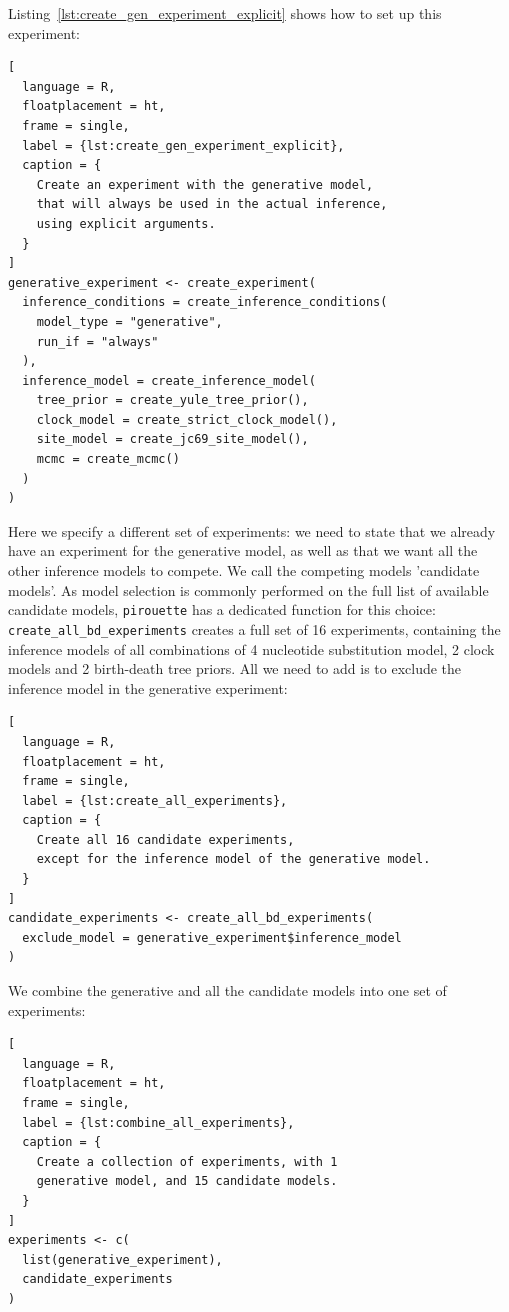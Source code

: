 Listing~\ref{lst:create_gen_experiment_explicit} shows how to
set up this experiment:

\begin{lstlisting}[
  language = R,
  floatplacement = ht,
  frame = single,
  label = {lst:create_gen_experiment_explicit},
  caption = {
    Create an experiment with the generative model,
    that will always be used in the actual inference, 
    using explicit arguments.
  }
]
generative_experiment <- create_experiment(
  inference_conditions = create_inference_conditions(
    model_type = "generative", 
    run_if = "always"
  ), 
  inference_model = create_inference_model(
    tree_prior = create_yule_tree_prior(),
    clock_model = create_strict_clock_model(), 
    site_model = create_jc69_site_model(),
    mcmc = create_mcmc()
  )
)
\end{lstlisting}

Here we specify a different set of experiments: we
need to state that we already have an experiment for
the generative model, as well as that we want all the other inference models 
to compete. We call the competing models 'candidate models'.
As model selection is commonly performed on the full list of available 
candidate models, \verb;pirouette; has a dedicated function 
for this choice: \verb;create_all_bd_experiments; creates a full set 
of 16 experiments, 
containing the inference models of all combinations of 4 nucleotide substitution model, 
2 clock models and 2 birth-death tree priors. All we need to add is to exclude the 
inference model in the generative experiment:

\begin{lstlisting}[
  language = R, 
  floatplacement = ht, 
  frame = single, 
  label = {lst:create_all_experiments},
  caption = {
    Create all 16 candidate experiments, 
    except for the inference model of the generative model.
  }
]
candidate_experiments <- create_all_bd_experiments(
  exclude_model = generative_experiment$inference_model
)
\end{lstlisting}

We combine the generative and all the candidate models into one set of 
experiments:

\begin{lstlisting}[
  language = R, 
  floatplacement = ht, 
  frame = single, 
  label = {lst:combine_all_experiments},
  caption = {
    Create a collection of experiments, with 1
    generative model, and 15 candidate models.
  }
]
experiments <- c(
  list(generative_experiment),
  candidate_experiments
)
\end{lstlisting}

